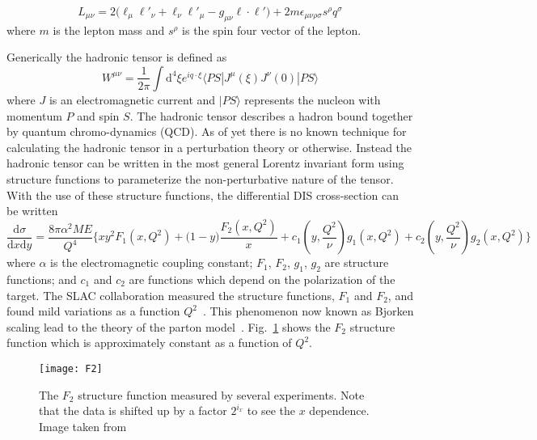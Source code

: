 \begin{equation}
  L_{\mu\nu} = 2\Big(\ell_{\mu}\ell'_{\nu} + \ell_{\nu}\ell'_{\mu} -
  g_{\mu\nu}\ell \cdot \ell' \Big) +
  2m\epsilon_{\mu\nu\rho\sigma}s^{\rho}q^{\sigma}
\end{equation}
\noindent
where $m$ is the lepton mass and $s^{\rho}$ is the spin four vector of the
lepton.

Generically the hadronic tensor is defined as
\begin{equation}
  W^{\mu\nu} = \frac{1}{2\pi}
  \int \mathrm{d}^4\xi e^{iq \cdot \xi}
  \langle PS | J^{\mu}(\xi)J^{\nu}(0) | PS \rangle
\end{equation}
\noindent
where $J$ is an electromagnetic current and $|PS \rangle$ represents the nucleon
with momentum $P$ and spin $S$.  The hadronic tensor describes a hadron bound
together by quantum chromo-dynamics (QCD).  As of yet there is no known
technique for calculating the hadronic tensor in a perturbation theory or
otherwise.  Instead the hadronic tensor can be written in the most general
Lorentz invariant form using structure functions to parameterize the
non-perturbative nature of the tensor.  With the use of these structure
functions, the differential DIS cross-section can be written
\begin{equation}
  \label{equ::DIS_diffxsection}
  \frac{\mathrm{d}\sigma}{\mathrm{d}x\mathrm{d}y} =
  \frac{8\pi\alpha^2ME}{Q^4}
  \Big\{
  xy^2F_1(x, Q^2) + \Big(1-y\Big)\frac{F_2(x, Q^2)}{x}
  + c_1(y, \frac{Q^2}{\nu}) g_1(x, Q^2) + c_2(y, \frac{Q^2}{\nu}) g_2(x, Q^2)
  \Big \}
\end{equation}
\noindent
where $\alpha$ is the electromagnetic coupling constant; $F_1$, $F_2$, $g_1$,
$g_2$ are structure functions; and $c_1$ and $c_2$ are functions which depend on
the polarization of the target.  The SLAC collaboration measured the structure
functions, $F_1$ and $F_2$, and found mild variations as a function
$Q^2$~\cite{Bloom:1969kc,Breidenbach:1969kd}.  This phenomenon now known as
Bjorken scaling lead to the theory of the parton model~\cite{Bjorken:1969ja}.
Fig.~\ref{fig::F2} shows the $F_2$ structure function which is approximately
constant as a function of $Q^2$.

\begin{figure}[h!t]
  \centering
  \texttt{[image: F2]}
  \caption{The $F_2$ structure function measured by several experiments.  Note
    that the data is shifted up by a factor $2^{i_x}$ to see the $x$ dependence.
    Image taken from~\cite{Tanabashi:2018oca}}
  \label{fig::F2}
\end{figure}


